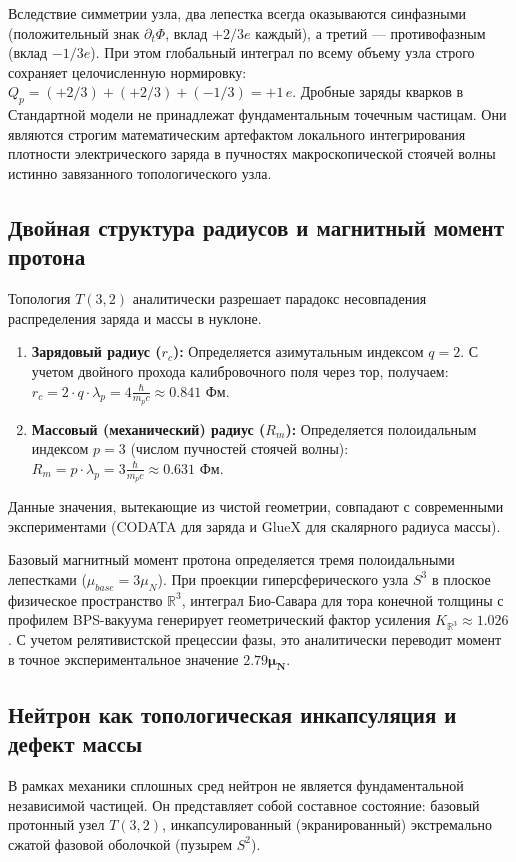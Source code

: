 \documentclass[12pt,a4paper]{article}
\begin{document}
	Вследствие симметрии узла, два лепестка всегда оказываются синфазными (положительный знак $\partial_t \Phi$, вклад $+2/3 e$ каждый), а третий — противофазным (вклад $-1/3 e$). При этом глобальный интеграл по всему объему узла строго сохраняет целочисленную нормировку: $Q_p = (+2/3) + (+2/3) + (-1/3) = +1\,e$.
	Дробные заряды кварков в Стандартной модели не принадлежат фундаментальным точечным частицам. Они являются строгим математическим артефактом локального интегрирования плотности электрического заряда в пучностях макроскопической стоячей волны истинно завязанного топологического узла.
	
	\subsection{Двойная структура радиусов и магнитный момент протона}
	Топология $T(3,2)$ аналитически разрешает парадокс несовпадения распределения заряда и массы в нуклоне.
	\begin{enumerate}
		\item \textbf{Зарядовый радиус ($r_c$):} Определяется азимутальным индексом $q=2$. С учетом двойного прохода калибровочного поля через тор, получаем: $r_c = 2 \cdot q \cdot \lambda_p = 4 \frac{\hbar}{m_p c} \approx \mathbf{0.841 \text{ Фм}}$.
		\item \textbf{Массовый (механический) радиус ($R_m$):} Определяется полоидальным индексом $p=3$ (числом пучностей стоячей волны): $R_m = p \cdot \lambda_p = 3 \frac{\hbar}{m_p c} \approx \mathbf{0.631 \text{ Фм}}$.
	\end{enumerate}
	Данные значения, вытекающие из чистой геометрии, совпадают с современными экспериментами (CODATA для заряда и GlueX для скалярного радиуса массы).
	
	Базовый магнитный момент протона определяется тремя полоидальными лепестками ($\mu_{base} = 3 \mu_N$). При проекции гиперсферического узла $S^3$ в плоское физическое пространство $\mathbb{R}^3$, интеграл Био-Савара для тора конечной толщины с профилем BPS-вакуума генерирует геометрический фактор усиления $K_{\mathbb{R}^3} \approx 1.026$. С учетом релятивистской прецессии фазы, это аналитически переводит момент в точное экспериментальное значение $\mathbf{2.79 \mu_N}$.
	
	\subsection{Нейтрон как топологическая инкапсуляция и дефект массы}
	В рамках механики сплошных сред нейтрон не является фундаментальной независимой частицей. Он представляет собой составное состояние: базовый протонный узел $T(3,2)$, инкапсулированный (экранированный) экстремально сжатой фазовой оболочкой (пузырем $S^2$). 
	
\end{document}
